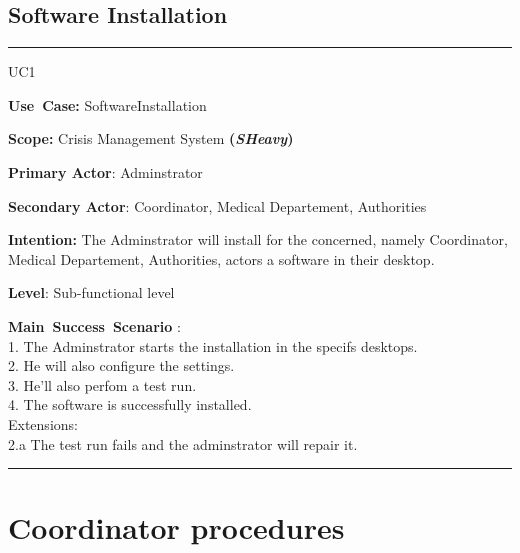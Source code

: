 \subsection{Software Installation}
\vspace{0.5cm}
\hrule
\vspace{0.5cm}
\begin{lyxlist}{UC1}
\small{
\item [\textbf{Use~Case:}] SoftwareInstallation
\item [\textbf{Scope:}] Crisis Management System \textbf{(\emph{SHeavy})}
\item [\textbf{Primary Actor}:] Adminstrator
\item [\textbf{Secondary Actor}:] Coordinator, Medical Departement, Authorities
\item [\textbf{Intention:}] The Adminstrator will install for the concerned,
namely  Coordinator, Medical Departement, Authorities, actors a software in
their desktop.
\item [\textbf{Level}:]Sub-functional level
\item [\textbf{Main~Success~Scenario}]:\\
1. The Adminstrator starts the installation in the specifs desktops.\\
2. He will also configure the settings.\\
3. He'll also perfom a test run.\\
4. The software is successfully installed.\\
Extensions:\\
2.a The test run fails and the adminstrator will repair it.\\
}
\end{lyxlist}
\hrule 
\vspace{0.5cm}


\section{Coordinator procedures}

